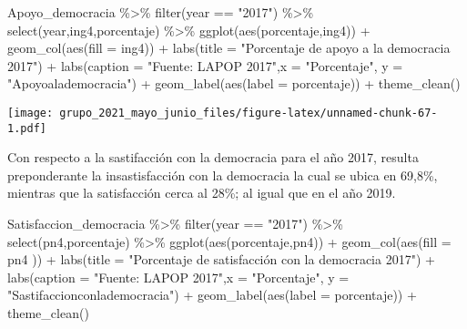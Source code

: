 \documentclass[
]{book}
\newenvironment{Shaded}{\begin{snugshade}}{\end{snugshade}}
\newcommand{\AttributeTok}[1]{\textcolor[rgb]{0.77,0.63,0.00}{#1}}
\newcommand{\FunctionTok}[1]{\textcolor[rgb]{0.00,0.00,0.00}{#1}}
\newcommand{\NormalTok}[1]{#1}
\newcommand{\SpecialCharTok}[1]{\textcolor[rgb]{0.00,0.00,0.00}{#1}}
\newcommand{\StringTok}[1]{\textcolor[rgb]{0.31,0.60,0.02}{#1}}
\begin{document}
\begin{Shaded}
\begin{Highlighting}[]
\NormalTok{Apoyo\_democracia }\SpecialCharTok{\%\textgreater{}\%}
  \FunctionTok{filter}\NormalTok{(year }\SpecialCharTok{==} \StringTok{"2017"}\NormalTok{) }\SpecialCharTok{\%\textgreater{}\%}
  \FunctionTok{select}\NormalTok{(year,ing4,porcentaje) }\SpecialCharTok{\%\textgreater{}\%}
  \FunctionTok{ggplot}\NormalTok{(}\FunctionTok{aes}\NormalTok{(porcentaje,ing4)) }\SpecialCharTok{+} 
  \FunctionTok{geom\_col}\NormalTok{(}\FunctionTok{aes}\NormalTok{(}\AttributeTok{fill =}\NormalTok{ ing4)) }\SpecialCharTok{+}
  \FunctionTok{labs}\NormalTok{(}\AttributeTok{title =} \StringTok{"Porcentaje de apoyo a la democracia 2017"}\NormalTok{) }\SpecialCharTok{+}
  \FunctionTok{labs}\NormalTok{(}\AttributeTok{caption =} \StringTok{"Fuente: LAPOP 2017"}\NormalTok{,}\AttributeTok{x =} \StringTok{"Porcentaje"}\NormalTok{, }\AttributeTok{y =} \StringTok{"Apoyoalademocracia"}\NormalTok{) }\SpecialCharTok{+}
  \FunctionTok{geom\_label}\NormalTok{(}\FunctionTok{aes}\NormalTok{(}\AttributeTok{label =}\NormalTok{ porcentaje)) }\SpecialCharTok{+}
  \FunctionTok{theme\_clean}\NormalTok{()}
\end{Highlighting}
\end{Shaded}

\texttt{[image: grupo\_2021\_mayo\_junio\_files/figure-latex/unnamed-chunk-67-1.pdf]}

Con respecto a la sastifacción con la democracia para el año 2017, resulta preponderante la insastisfacción con la democracia la cual se ubica en 69,8\%, mientras que la satisfacción cerca al 28\%; al igual que en el año 2019.

\begin{Shaded}
\begin{Highlighting}[]
\NormalTok{Satisfaccion\_democracia }\SpecialCharTok{\%\textgreater{}\%}
  \FunctionTok{filter}\NormalTok{(year }\SpecialCharTok{==} \StringTok{"2017"}\NormalTok{) }\SpecialCharTok{\%\textgreater{}\%}
  \FunctionTok{select}\NormalTok{(pn4,porcentaje) }\SpecialCharTok{\%\textgreater{}\%}
  \FunctionTok{ggplot}\NormalTok{(}\FunctionTok{aes}\NormalTok{(porcentaje,pn4))  }\SpecialCharTok{+} 
  \FunctionTok{geom\_col}\NormalTok{(}\FunctionTok{aes}\NormalTok{(}\AttributeTok{fill =}\NormalTok{ pn4 )) }\SpecialCharTok{+}
  \FunctionTok{labs}\NormalTok{(}\AttributeTok{title =} \StringTok{"Porcentaje de satisfacción con la democracia 2017"}\NormalTok{) }\SpecialCharTok{+}
  \FunctionTok{labs}\NormalTok{(}\AttributeTok{caption =} \StringTok{"Fuente: LAPOP 2017"}\NormalTok{,}\AttributeTok{x =} \StringTok{"Porcentaje"}\NormalTok{, }\AttributeTok{y =} \StringTok{"Sastifaccionconlademocracia"}\NormalTok{) }\SpecialCharTok{+}
  \FunctionTok{geom\_label}\NormalTok{(}\FunctionTok{aes}\NormalTok{(}\AttributeTok{label =}\NormalTok{ porcentaje)) }\SpecialCharTok{+}
  \FunctionTok{theme\_clean}\NormalTok{()}
\end{Highlighting}
\end{Shaded}
\end{document}
